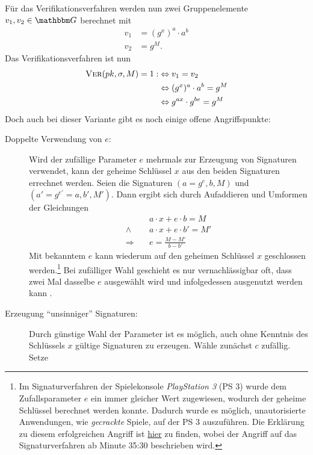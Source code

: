 Für das Verifikationsverfahren werden nun zwei Gruppenelemente $v_1, v_2
\in \G$ berechnet mit
\begin{align*} 
  v_1 &= (g^x)^a \cdot a^b\\ v_2 &= g^M.
\end{align*}
Das Verifikationsverfahren ist nun
\begin{align*} 
  \textsc{Ver}(pk,\sigma,M) = 1 : & \Leftrightarrow v_1 = v_2 \\
                             &\Leftrightarrow (g^x)^a \cdot a^b = g^M \\ 
                             &\Leftrightarrow g^{ax}\cdot g^{be} = g^M
\end{align*} 
Doch auch bei dieser Variante gibt es noch einige offene
Angriffspunkte:
\begin{description}
\item[Doppelte Verwendung von $e$:] Wird der zufällige Parameter
  $e$ mehrmals zur Erzeugung von Signaturen verwendet, kann der geheime
  Schlüssel $x$ aus den beiden Signaturen errechnet werden. Seien die
  Signaturen $(a = g^e, b, M)$ und $(a' = g^{e'} = a, b', M')$. Dann
  ergibt sich durch Aufaddieren und Umformen der Gleichungen
  \begin{align*} &a \cdot x + e \cdot b = M\\ \land \quad &a \cdot
                                                            x + e \cdot b' = M'\\ \Rightarrow \quad &e = \frac{M - M'}{b - b'}
  \end{align*} Mit bekanntem $e$ kann wiederum auf den geheimen
  Schlüssel $x$ geschlossen werden.\footnote{Im Signaturverfahren der
    Spielekonsole \textit{PlayStation 3} (PS 3) wurde dem Zufallsparameter
    $e$ ein immer gleicher Wert zugewiesen, wodurch der geheime Schlüssel
    berechnet werden konnte. Dadurch wurde es möglich, unautorisierte
    Anwendungen, wie \textit{gecrackte} Spiele, auf der PS 3
    auszuführen. Die Erklärung zu diesem erfolgreichen Angriff ist
    \href{https://www.youtube.com/watch?v=4loZGYqaZ7I}{hier} zu finden,
    wobei der Angriff auf das Signaturverfahren ab Minute 35:30 beschrieben
    wird.} Bei zufälliger Wahl geschieht es nur vernachlässigbar oft, dass
  zwei Mal dasselbe $e$ ausgewählt wird und infolgedessen ausgenutzt
  werden kann .
\item[Erzeugung "`unsinniger"' Signaturen:] Durch günstige Wahl
  der Parameter ist es möglich, auch ohne Kenntnis des Schlüssels $x$
  gültige Signaturen zu erzeugen. Wähle zunächst $c$ zufällig. Setze

\end{description}

